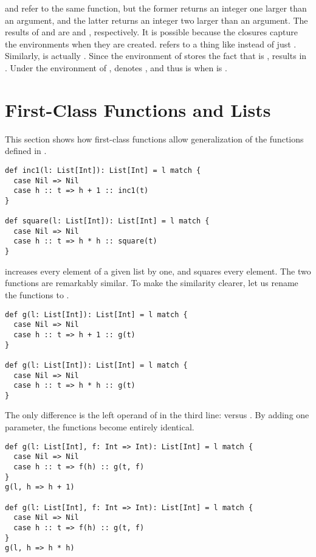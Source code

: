  and  refer to the same  function, but the
former returns an integer one larger than an argument, and the latter returns an
integer two larger than an argument. The results of  and
 are  and , respectively. It is possible because the
closures capture the environments when they are created.  refers to a
thing like  instead of just . Similarly,
 is actually . Since the environment of
 stores the fact that  is ,  results in
. Under the environment of ,  denotes , and
thus  is  when  is .

\section{First-Class Functions and Lists}

This section shows how first-class functions allow generalization of the functions
defined in .

\begin{verbatim}
def inc1(l: List[Int]): List[Int] = l match {
  case Nil => Nil
  case h :: t => h + 1 :: inc1(t)
}

def square(l: List[Int]): List[Int] = l match {
  case Nil => Nil
  case h :: t => h * h :: square(t)
}
\end{verbatim}

 increases every element of a given list by one, and 
squares every element. The two functions are remarkably similar. To make the
similarity clearer, let us rename the functions to .

\begin{verbatim}
def g(l: List[Int]): List[Int] = l match {
  case Nil => Nil
  case h :: t => h + 1 :: g(t)
}

def g(l: List[Int]): List[Int] = l match {
  case Nil => Nil
  case h :: t => h * h :: g(t)
}
\end{verbatim}

The only difference is the left operand of \code{::} in the third line:
 versus . By adding one parameter, the functions become
entirely identical.

\begin{verbatim}
def g(l: List[Int], f: Int => Int): List[Int] = l match {
  case Nil => Nil
  case h :: t => f(h) :: g(t, f)
}
g(l, h => h + 1)

def g(l: List[Int], f: Int => Int): List[Int] = l match {
  case Nil => Nil
  case h :: t => f(h) :: g(t, f)
}
g(l, h => h * h)
\end{verbatim}

